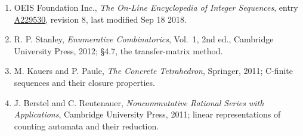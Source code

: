 \documentclass[11pt]{article}
\theoremstyle{definition}
\begin{document}
\begin{enumerate}

\item OEIS Foundation Inc., \emph{The On-Line Encyclopedia of Integer Sequences}, entry \href{https://oeis.org/A229530}{A229530}, revision 8, last modified Sep 18 2018.

\item R. P. Stanley, \emph{Enumerative Combinatorics}, Vol.~1, 2nd ed., Cambridge University Press, 2012; \S4.7, the transfer-matrix method.

\item M. Kauers and P. Paule, \emph{The Concrete Tetrahedron}, Springer, 2011; C-finite sequences and their closure properties.

\item J. Berstel and C. Reutenauer, \emph{Noncommutative Rational Series with Applications}, Cambridge University Press, 2011; linear representations of counting automata and their reduction.

\end{enumerate}
\end{document}
